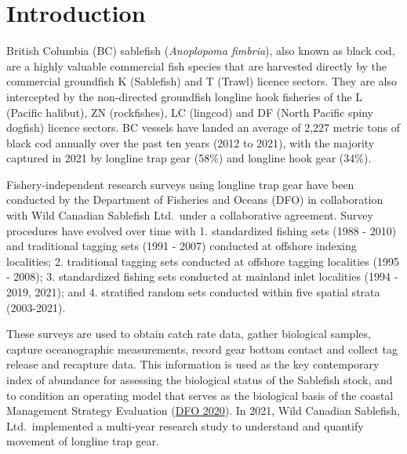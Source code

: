 \documentclass[12pt]{article}\usepackage[]{graphicx}\usepackage[]{color}
\begin{document}

\frontmatter


\renewcommand{\headrulewidth}{0.5pt}  %
\renewcommand{\footrulewidth}{0.5pt}  %

\newcommand{\lt}{\ensuremath <}
\newcommand{\gt}{\ensuremath >}

\newlength{\cslhangindent}
\setlength{\cslhangindent}{1.5em}
\newenvironment{cslreferences}%
  {}%
  {\par}

\hypertarget{sec:introduction}{%
\section{Introduction}\label{sec:introduction}}

British Columbia (BC) sablefish (\emph{Anoplopoma fimbria}), also known as black cod, are a highly valuable commercial fish species that are harvested directly by the commercial groundfish K (Sablefish) and T (Trawl) licence sectors. They are also intercepted by the non-directed groundfish longline hook fisheries of the L (Pacific halibut), ZN (rockfishes), LC (lingcod) and DF (North Pacific spiny dogfish) licence sectors. BC vessels have landed an average of 2,227 metric tons of black cod annually over the past ten years (2012 to 2021), with the majority captured in 2021 by longline trap gear (58\%) and longline hook gear (34\%).

Fishery-independent research surveys using longline trap gear have been conducted by the Department of Fisheries and Oceans (DFO) in collaboration with Wild Canadian Sablefish Ltd.~under a collaborative agreement. Survey procedures have evolved over time with 1. standardized fishing sets (1988 - 2010) and traditional tagging sets (1991 - 2007) conducted at offshore indexing localities; 2. traditional tagging sets conducted at offshore tagging localities (1995 - 2008); 3. standardized fishing sets conducted at mainland inlet localities (1994 - 2019, 2021); and 4. stratified random sets conducted within five spatial strata (2003-2021).

These surveys are used to obtain catch rate data, gather biological samples, capture oceanographic measurements, record gear bottom contact and collect tag release and recapture data. This information is used as the key contemporary index of abundance for assessing the biological status of the Sablefish stock, and to condition an operating model that serves as the biological basis of the coastal Management Strategy Evaluation (\protect\hyperlink{ref-DFO2020}{DFO 2020}). In 2021, Wild Canadian Sablefish, Ltd.~implemented a multi-year research study to understand and quantify movement of longline trap gear.
\end{document}
